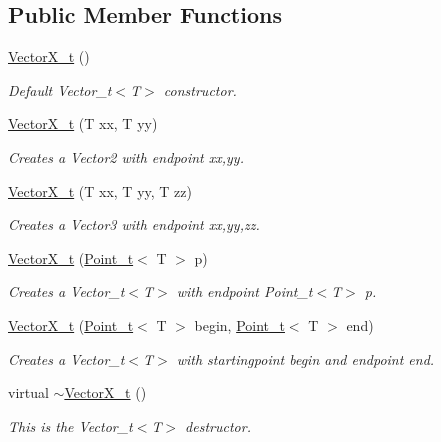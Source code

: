 \subsection*{Public Member Functions}
\begin{DoxyCompactItemize}
\item 
\hyperlink{class_vector_x__t_a0afaded32c122f68359ed9aa789978f2}{Vector\+X\+\_\+t} ()
\begin{DoxyCompactList}\small\item\em Default Vector\+\_\+t$<$\+T$>$ constructor. \end{DoxyCompactList}\item 
\hyperlink{class_vector_x__t_a3e9c4344b74f4a74924188c9d7ee6b16}{Vector\+X\+\_\+t} (T xx, T yy)
\begin{DoxyCompactList}\small\item\em Creates a Vector2 with endpoint xx,yy. \end{DoxyCompactList}\item 
\hyperlink{class_vector_x__t_a11ee21d75512d8ecf7cbb21b97e4b47e}{Vector\+X\+\_\+t} (T xx, T yy, T zz)
\begin{DoxyCompactList}\small\item\em Creates a Vector3 with endpoint xx,yy,zz. \end{DoxyCompactList}\item 
\hyperlink{class_vector_x__t_a25ef303a780ddfd52572d95c232d2a5b}{Vector\+X\+\_\+t} (\hyperlink{class_point__t}{Point\+\_\+t}$<$ T $>$ p)
\begin{DoxyCompactList}\small\item\em Creates a Vector\+\_\+t$<$\+T$>$ with endpoint Point\+\_\+t$<$\+T$>$ p. \end{DoxyCompactList}\item 
\hyperlink{class_vector_x__t_a8ac4f12ebd7673a4b3b7cf86e842c912}{Vector\+X\+\_\+t} (\hyperlink{class_point__t}{Point\+\_\+t}$<$ T $>$ begin, \hyperlink{class_point__t}{Point\+\_\+t}$<$ T $>$ end)
\begin{DoxyCompactList}\small\item\em Creates a Vector\+\_\+t$<$\+T$>$ with startingpoint begin and endpoint end. \end{DoxyCompactList}\item 
virtual \hyperlink{class_vector_x__t_a91e541bc8a28a206c0caaefee09c4fdc}{$\sim$\+Vector\+X\+\_\+t} ()
\begin{DoxyCompactList}\small\item\em This is the Vector\+\_\+t$<$\+T$>$ destructor. \end{DoxyCompactList}\item 

\end{DoxyCompactItemize}

